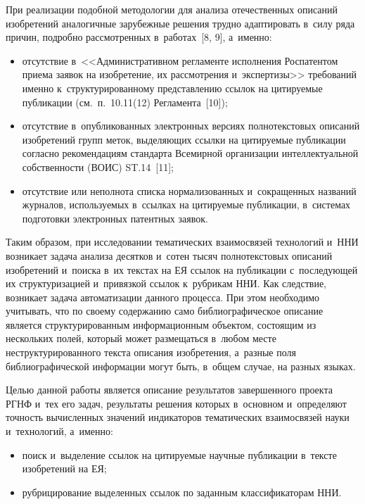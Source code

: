 \begin{multicols}{2}
  При реализации подобной методологии для анализа отечественных описаний изобретений
аналогичные зарубежные решения трудно адаптировать в~силу ряда причин, подробно
рассмотренных в~работах~[8, 9], а~именно:
  \begin{itemize}
\item отсутствие в~<<Административном регламенте исполнения Роспатентом приема
заявок на изо\-бре\-те\-ние, их рассмотрения и~экспертизы>> требований именно к~структурированному представлению ссылок на цитируемые публикации (см.\
п.~10.11(12) Регламента~[10]);
\item отсутствие в~опубликованных электронных версиях полнотекстовых описаний
изо\-бре\-те\-ний групп меток, выделяющих ссылки на цитируемые пуб\-ли\-ка\-ции согласно
рекомендациям стандарта Всемирной организации интеллектуальной собственности
(ВОИС) ST.14~[11];
\item отсутствие или неполнота списка нормализованных и~сокращенных названий
журналов, исполь\-зу\-емых в~ссылках на цитируемые пуб\-ли\-ка\-ции, в~системах подготовки
электронных патентных заявок.
\end{itemize}

  Таким образом, при исследовании тематических взаимосвязей технологий и~ННИ
  возникает задача анализа десятков и~сотен тысяч полнотекстовых
описаний изобретений и~поиска в~их текстах на ЕЯ ссылок на
публикации с~последующей их структуризацией и~привязкой ссылок к~руб\-ри\-кам
ННИ. Как следствие, возникает задача автоматизации данного
процесса. При этом необходимо учитывать, что по своему содержанию само
биб\-лио\-гра\-фи\-че\-ское описание является структурированным информационным объектом,
состоящим из нескольких полей, который может размещаться в~любом месте
неструктурированного текста описания изобретения, а~разные поля биб\-лио\-гра\-фи\-че\-ской
информации могут быть, в~общем случае, на разных %
языках.
{ %

}

  Целью данной работы является описание результатов завершенного проекта РГНФ и~тех
его задач, результаты решения которых в~основном и~определяют точность вычисленных
значений индикаторов тематических взаимосвязей науки и~технологий, а~именно:
  \begin{itemize}
\item поиск и~выделение ссылок на цитируемые научные публикации в~тексте
изобретений на ЕЯ;
\item рубрицирование выделенных ссылок по заданным классификаторам
ННИ.
\end{itemize}


\end{multicols}
